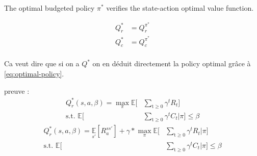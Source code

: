 \documentclass{article}
\begin{document}
\begin{property}

The optimal budgeted policy $\pi^*$ verifies the state-action optimal value function.

\begin{align}
Q^*_r &= Q^{\pi^*}_r\\
Q^*_c &= Q^{\pi^*}_c\\
\end{align}

\end{property}

Ca veut dire que si on a $Q^*$ on en déduit directement la policy optimal grâce à \cref{eq:optimal-policy}.


\begin{theorem}{Budgeted optimality bellman equation}}
\begin{align}
Q^*_r(s,a,\beta) = \mathbb{E}\limits_{s'} [R_a^{ss'} + \gamma \sum\limits_{a'} \pi_\mathcal{A}^*(s',\beta)_{a'} Q_r^*(s',a',\pi_\mathcal{B}^*(s',\beta)_{a'})]\\
Q^*_c(s,a,\beta) = \mathbb{E}\limits_{s'} [C_a^{ss'} + \gamma \sum\limits_{a'} \pi_\mathcal{A}^*(s',\beta)_{a'} Q_c^*(s',a',\pi_\mathcal{B}^*(s',\beta)_{a'})]
\end{align}
\end{theorem}



preuve :
\begin{align}
Q^*_r(s,a,\beta) = \max\limits_{\pi}\mathbb{E}[&\sum_{\mathrm{t} \geq 0} \gamma^{t} R_t] \\
\text{s.t. } \mathbb{E}[&\sum_{\mathrm{t} \geq 0} \gamma^{t} C_t | \pi] \leq \beta
\end{align}
\begin{align}
 Q^*_r(s,a,\beta) = \mathbb{E}\limits_{s'} [R_a^{ss'}] + \gamma * \max\limits_{\pi}\mathbb{E}[&\sum_{\mathrm{t} \geq 0} \gamma^{t} R_t | \pi]\\
\text{s.t. } \mathbb{E}[&\sum_{\mathrm{t} \geq 0} \gamma^{t} C_t | \pi] \leq \beta\\
\end{align}
\end{document}
